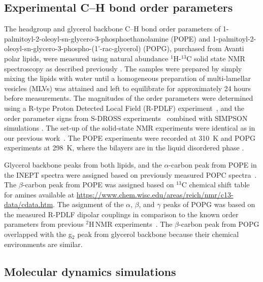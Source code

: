 \documentclass[journal=jpcbfk,manuscript=article]{achemso}
\begin{document}
\subsection{Experimental C--H bond order parameters}
The headgroup and glycerol backbone C--H bond order parameters of 1-palmitoyl-2-oleoyl-sn-glycero-3-phosphoethanolamine (POPE) and 1-palmitoyl-2-oleoyl-sn-glycero-3-phospho-(1'-rac-glycerol) (POPG), purchased from Avanti polar lipids, were measured using natural abundance $^1$H-$^{13}$C solid state NMR spectroscopy as described previously \cite{ferreira13,ferreira16}. The samples were prepared by simply mixing the lipids with water until a homogeneous preparation of multi-lamellar vesicles (MLVs) was attained and left to equilibrate for approximately 24 hours before measurements. The magnitudes of the order parameters were determined using a R-type Proton Detected Local Field (R-PDLF) experiment~\cite{dvinskikh04}, and the order parameter signs from S-DROSS experiments~\cite{gross97} combined with SIMPSON simulations \cite{bak00}.
The set-up of the solid-state NMR experiments were identical as in our previous work~\cite{antila19}. The POPE experiments were recorded at 310~K and POPG experiments at 298~K, where the bilayers are in the liquid disordered phase \cite{marsh13}.

Glycerol backbone peaks from both lipids, and the $\alpha$-carbon peak from POPE in the INEPT spectra 
were assigned based on previously measured POPC spectra~\cite{ferreira13}.
The $\beta$-carbon peak from POPE was assigned based on $^{13}$C chemical shift table for amines available
at \url{https://www.chem.wisc.edu/areas/reich/nmr/c13-data/cdata.htm}. The asignment of the $\alpha$, $\beta$, and $\gamma$ peaks of POPG was based on the measured R-PDLF dipolar couplings in comparison to the known order parameters from previous $^2$H\,NMR experiments~\cite{borle85,wohlgemuth80}.   
The $\beta$-carbon peak from POPG overlapped with the g$_2$ peak from glycerol backbone
because their chemical environments are similar.

\subsection{Molecular dynamics simulations}
\end{document}

